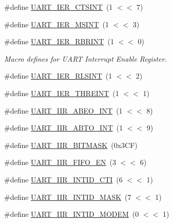 \begin{DoxyCompactItemize}
\item 
\#define \hyperlink{group__UART__17XX__40XX_ga1dd8f89b44fd3a2b0d22dd7c6ad4fe5f}{U\+A\+R\+T\+\_\+\+I\+E\+R\+\_\+\+C\+T\+S\+I\+NT}~(1 $<$$<$ 7)
\item 
\#define \hyperlink{group__UART__17XX__40XX_ga149affc2ce17a660a640f26d3212a624}{U\+A\+R\+T\+\_\+\+I\+E\+R\+\_\+\+M\+S\+I\+NT}~(1 $<$$<$ 3)
\item 
\#define \hyperlink{group__UART__17XX__40XX_gafe8ecd345fb121d6b0ce19f4ce6672ba}{U\+A\+R\+T\+\_\+\+I\+E\+R\+\_\+\+R\+B\+R\+I\+NT}~(1 $<$$<$ 0)
\begin{DoxyCompactList}\small\item\em Macro defines for U\+A\+RT Interrupt Enable Register. \end{DoxyCompactList}\item 
\#define \hyperlink{group__UART__17XX__40XX_ga79f6b167debe3a8e37d40e4d30f1daec}{U\+A\+R\+T\+\_\+\+I\+E\+R\+\_\+\+R\+L\+S\+I\+NT}~(1 $<$$<$ 2)
\item 
\#define \hyperlink{group__UART__17XX__40XX_gaa0d5f875782af503852f8b8f93292673}{U\+A\+R\+T\+\_\+\+I\+E\+R\+\_\+\+T\+H\+R\+E\+I\+NT}~(1 $<$$<$ 1)
\item 
\#define \hyperlink{group__UART__17XX__40XX_ga6ce7f02b02e196d84ef8f6066dd2b9d4}{U\+A\+R\+T\+\_\+\+I\+I\+R\+\_\+\+A\+B\+E\+O\+\_\+\+I\+NT}~(1 $<$$<$ 8)
\item 
\#define \hyperlink{group__UART__17XX__40XX_ga29486c78b0afdb4b3943defe36d5404c}{U\+A\+R\+T\+\_\+\+I\+I\+R\+\_\+\+A\+B\+T\+O\+\_\+\+I\+NT}~(1 $<$$<$ 9)
\item 
\#define \hyperlink{group__UART__17XX__40XX_gad443b74131fa7b7aecf0f1c581172faa}{U\+A\+R\+T\+\_\+\+I\+I\+R\+\_\+\+B\+I\+T\+M\+A\+SK}~(0x3\+C\+F)
\item 
\#define \hyperlink{group__UART__17XX__40XX_ga29b20e73585acb416f112502d29554d7}{U\+A\+R\+T\+\_\+\+I\+I\+R\+\_\+\+F\+I\+F\+O\+\_\+\+EN}~(3 $<$$<$ 6)
\item 
\#define \hyperlink{group__UART__17XX__40XX_ga965ba229214955385f11277549b7ecce}{U\+A\+R\+T\+\_\+\+I\+I\+R\+\_\+\+I\+N\+T\+I\+D\+\_\+\+C\+TI}~(6 $<$$<$ 1)
\item 
\#define \hyperlink{group__UART__17XX__40XX_ga6f78952aec5835ac753718323b681910}{U\+A\+R\+T\+\_\+\+I\+I\+R\+\_\+\+I\+N\+T\+I\+D\+\_\+\+M\+A\+SK}~(7 $<$$<$ 1)
\item 
\#define \hyperlink{group__UART__17XX__40XX_gaf02dabd5f0b60345c70379ab8df3e899}{U\+A\+R\+T\+\_\+\+I\+I\+R\+\_\+\+I\+N\+T\+I\+D\+\_\+\+M\+O\+D\+EM}~(0 $<$$<$ 1)
\item 
$$
\end{DoxyCompactItemize}
